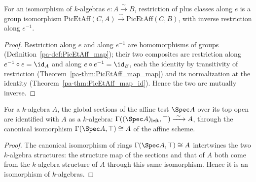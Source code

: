 \begin{definition}
  \label{pa-def:PicEtAff_congr}
  \leanok

  For an isomorphism of \(k\)-algebras \(e \colon A \xrightarrow{\ \sim\ } B\), restriction of plus
  classes along \(e\) is a group isomorphism \(\mathrm{PicEtAff}(C, A) \xrightarrow{\ \sim\ }
  \mathrm{PicEtAff}(C, B)\), with inverse restriction along \(e^{-1}\).
\end{definition}
\begin{proof}
  \leanok
  Restriction along \(e\) and along \(e^{-1}\) are homomorphisms of groups
  (Definition~\ref{pa-def:PicEtAff_map}); their two composites are restriction along
  \(e^{-1} \circ e = \id_A\) and along \(e \circ e^{-1} = \id_B\), each the identity by transitivity
  of restriction (Theorem~\ref{pa-thm:PicEtAff_map_map}) and its normalization at the identity
  (Theorem~\ref{pa-thm:PicEtAff_map_id}). Hence the two are mutually inverse.
\end{proof}

\begin{definition}
  \label{pa-def:overSpecGammaTop}
  \leanok

  For a \(k\)-algebra \(A\), the global sections of the affine test \(\Spec A\) over its top open
  are identified with \(A\) as a \(k\)-algebra: \(\Gamma((\Spec A)_{\mathrm{left}}, \top)
  \xrightarrow{\ \sim\ } A\), through the canonical isomorphism \(\Gamma(\Spec A, \top) \cong A\) of
  the affine scheme.
\end{definition}
\begin{proof}
  \leanok
  The canonical isomorphism of rings \(\Gamma(\Spec A, \top) \cong A\) intertwines the two
  \(k\)-algebra structures: the structure map of the sections and that of \(A\) both come from the
  \(k\)-algebra structure of \(A\) through this same isomorphism. Hence it is an isomorphism of
  \(k\)-algebras.
\end{proof}

